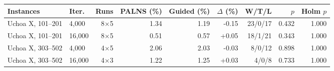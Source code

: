 \begin{tabular}{llrrrrrrr}
\toprule
Instances & Iter. & Runs & PALNS (\%) & Guided (\%) & $\Delta$ (\%) & W/T/L & $p$ & Holm $p$ \\
\midrule
Uchoa X, 101--201 & 4{,}000 & 8$\times$5 & 1.34 & 1.19 & -0.15 & 23/0/17 & 0.432 & 1.000 \\
Uchoa X, 101--201 & 16{,}000 & 8$\times$5 & 0.51 & 0.57 & +0.05 & 18/1/21 & 0.343 & 1.000 \\
Uchoa X, 303--502 & 4{,}000 & 4$\times$5 & 2.06 & 2.03 & -0.03 & 8/0/12 & 0.898 & 1.000 \\
Uchoa X, 303--502 & 16{,}000 & 4$\times$3 & 1.22 & 1.25 & +0.03 & 4/0/8 & 0.733 & 1.000 \\
\bottomrule
\end{tabular}
